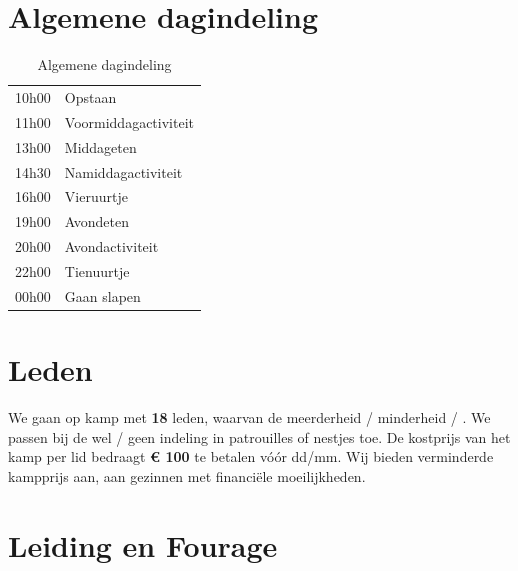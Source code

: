 \documentclass[fleqn,10pt]{src/KampSjabloon}
\newcommand{\kampprijs}{100} %
\newcommand{\ledenaantal}{18}
\begin{document}

\section{Algemene dagindeling}

\begin{table}[H]
\centering
\begin{tabularx}{5cm}{lX}
\toprule

10h00 & Opstaan\\
11h00 & Voormiddagactiviteit\\
13h00 & Middageten\\
14h30 & Namiddagactiviteit\\
16h00 & Vieruurtje\\
19h00 & Avondeten\\
20h00 & Avondactiviteit\\
22h00 & Tienuurtje\\
00h00 & Gaan slapen\\

\bottomrule
\end{tabularx}
\caption{Algemene dagindeling}
\end{table}


\section{Leden}

We gaan op kamp met \textbf{\ledenaantal} leden, waarvan de meerderheid / minderheid \male / \female. We passen bij de \Tak wel / geen indeling in patrouilles of nestjes  toe. De kostprijs van het kamp per lid bedraagt \textbf{\euro{ \kampprijs}} te betalen vóór dd/mm. Wij bieden verminderde kampprijs aan, aan gezinnen met financiële moeilijkheden.


\section{Leiding en Fourage}
\end{document}
